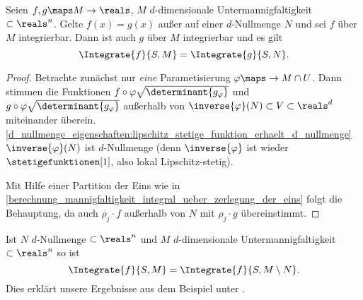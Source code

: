 \begin{satz}
  Seien \( f,g\maps M\to \reals \), \( M \) \( d \)-dimensionale Untermannigfaltigkeit \( \subset \reals^n \). Gelte \( f(x)=g(x) \) außer auf einer \( d \)-Nullmenge \( N \) und sei \( f \) über \( M \) integrierbar. Dann ist auch \( g \) über \( M \) integrierbar und es gilt
  \begin{equation*}
    \Integrate{f}{S,M}=\Integrate{g}{S,N}.
  \end{equation*}
\end{satz}
\begin{proof}
  Betrachte zunächst nur \emph{eine} Parametisierung \( \varphi\maps \to M\cap U \). Dann stimmen die Funktionen \( f\circ \varphi \sqrt{\determinant{g_{\varphi}}}  \) und \( g\circ \varphi\sqrt{\determinant{g_{\varphi}}} \) außerhalb von \( \inverse{\varphi}(N)\subset V\subset \reals^d \) miteinander überein. \ref{d_nullmenge_eigenschaften:lipschitz_stetige_funktion_erhaelt_d_nullmenge} \timplies \( \inverse{\varphi}(N) \) ist \( d \)-Nullmenge (denn \( \inverse{\varphi} \)  ist wieder \( \stetigefunktionen[1] \), also lokal Lipschitz-stetig).
  
  Mit Hilfe einer Partition der Eins wie in \ref{berechnung_mannigfaltigkeit_integral_ueber_zerlegung_der_eins} folgt die Behauptung, da auch \( \rho_j\cdot f \) außerhalb von \( N \) mit \( \rho_j\cdot g \)
  übereinstimmt.
\end{proof}
\begin{folgerung*}
  Ist \( N \) \( d \)-Nullmenge \( \subset \reals^n \) und \( M \) \( d \)-dimensionale Untermannigfaltigkeit \( \subset \reals^n \) so ist
  \begin{equation*}
    \Integrate{f}{S,M}=\Integrate{f}{S,M\setminus N}.
  \end{equation*}
  Dies erklärt unsere Ergebnisse aus dem Beispiel unter .
\end{folgerung*}
